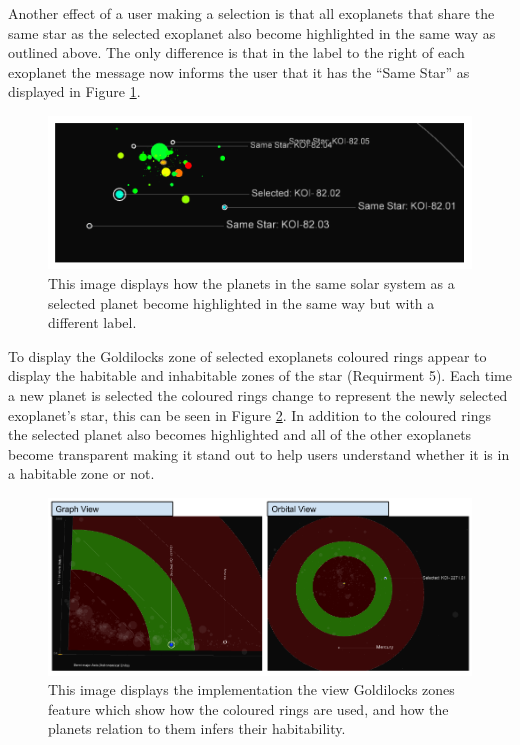 Another effect of a user making a selection is that all exoplanets that share
the same star as the selected exoplanet also become highlighted in the
same way as outlined above. The only difference is that in the label to the
right
of each exoplanet the message now informs the user that it has the ``Same
Star'' as displayed in Figure \ref{fig:sameStar}.

\begin{figure}[H]
  \centering
      \includegraphics[width=1\textwidth]{images/sameStar.png}
  \caption[Implementation of exoplanets in the same solar system]{This image
displays how the planets in the same solar system as a selected planet become
highlighted in the same way but with a different label.}  
    \label{fig:sameStar}
\end{figure}


To display the Goldilocks zone of selected exoplanets coloured rings appear to
display the habitable
and inhabitable zones of the star (Requirment 5). Each time a new planet is
selected the
coloured rings change to represent the newly selected exoplanet's star, this can
be seen in Figure
\ref{fig:habitable}. In addition to the coloured rings the selected planet also
becomes highlighted
and all of the other exoplanets become transparent making it stand out to help users understand
whether it is in a habitable zone or not.

\begin{figure}[H]
  \centering
      \includegraphics[width=1\textwidth]{images/habitable.png}
  \caption[Implementation of Goldilocks zones]{This image displays the
implementation the view Goldilocks zones feature which show how the coloured
rings are used, and how the planets relation to them infers their habitability.}
  
    \label{fig:habitable}
\end{figure}

